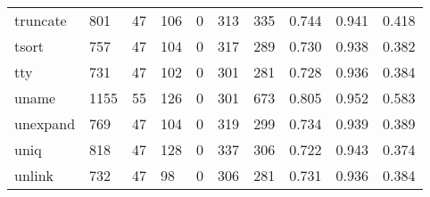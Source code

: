 \begin{longtable}{lp{1.3cm}p{1.3cm}p{1.3cm}p{1.3cm}p{1.3cm}p{1.3cm}p{1.3cm}p{1.3cm}p{1.3cm}}
truncate  &                    801 &                                 47 &                               106 &                                0 &                               313 &                             335 &                                0.744 &                                  0.941 &                                0.418 \\
tsort     &                    757 &                                 47 &                               104 &                                0 &                               317 &                             289 &                                0.730 &                                  0.938 &                                0.382 \\
tty       &                    731 &                                 47 &                               102 &                                0 &                               301 &                             281 &                                0.728 &                                  0.936 &                                0.384 \\
uname     &                   1155 &                                 55 &                               126 &                                0 &                               301 &                             673 &                                0.805 &                                  0.952 &                                0.583 \\
unexpand  &                    769 &                                 47 &                               104 &                                0 &                               319 &                             299 &                                0.734 &                                  0.939 &                                0.389 \\
uniq      &                    818 &                                 47 &                               128 &                                0 &                               337 &                             306 &                                0.722 &                                  0.943 &                                0.374 \\
unlink    &                    732 &                                 47 &                                98 &                                0 &                               306 &                             281 &                                0.731 &                                  0.936 &                                0.384 \\

\end{longtable}
